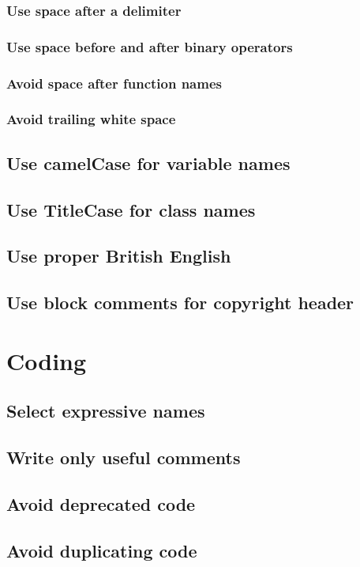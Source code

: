 \documentclass[a4paper,11pt]{scrreprt}
\begin{document}
\subsection{Use space after a delimiter}
\subsection{Use space before and after binary operators}
\subsection{Avoid space after function names}
\subsection{Avoid trailing white space}
\section{Use camelCase for variable names}
\section{Use TitleCase for class names}
\section{Use proper British English}
\section{Use block comments for copyright header}


\chapter{Coding}
\section{Select expressive names}
\section{Write only useful comments}
\section{Avoid deprecated code}
\section{Avoid duplicating code}
\end{document}
